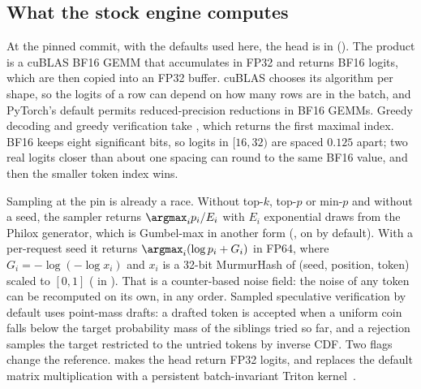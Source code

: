 \subsection{What the stock engine computes}\label{sec:stock}
At the pinned commit, with the defaults used here, the head is  in  (). The product is a cuBLAS BF16 GEMM that accumulates in FP32 and returns BF16 logits, which are then copied into an FP32 buffer. cuBLAS chooses its algorithm per shape, so the logits of a row can depend on how many rows are in the batch, and PyTorch's default permits reduced-precision reductions in BF16 GEMMs. Greedy decoding and greedy verification take , which returns the first maximal index. BF16 keeps eight significant bits, so logits in $[16,32)$ are spaced $0.125$ apart; two real logits closer than about one spacing can round to the same BF16 value, and then the smaller token index wins.

Sampling at the pin is already a race. Without top-$k$, top-$p$ or min-$p$ and without a seed, the sampler returns $\argmax_i p_i/E_i$ with $E_i$ exponential draws from the Philox generator, which is Gumbel-max in another form (, on by default). With a per-request seed it returns $\argmax_i(\log p_i+G_i)$ in FP64, where $G_i=-\log(-\log x_i)$ and $x_i$ is a 32-bit MurmurHash of (seed, position, token) scaled to $[0,1]$ ( in ). That is a counter-based noise field: the noise of any token can be recomputed on its own, in any order. Sampled speculative verification by default uses point-mass drafts: a drafted token is accepted when a uniform coin falls below the target probability mass of the siblings tried so far, and a rejection samples the target restricted to the untried tokens by inverse CDF. Two flags change the reference.  makes the head return FP32 logits, and  replaces the default matrix multiplication with a persistent batch-invariant Triton kernel~\cite{sglangdeterministic}.

